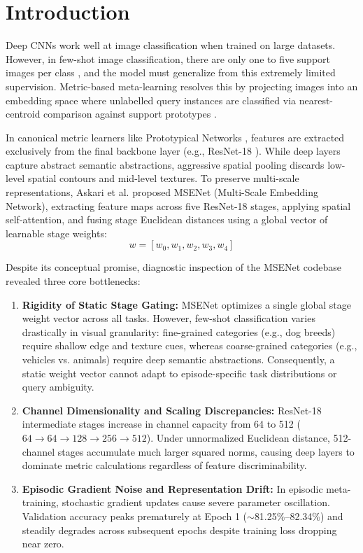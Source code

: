\documentclass[conference]{IEEEtran}
\begin{document}
\section{Introduction}
Deep CNNs work well at image classification when trained on large datasets. However, in few-shot image classification, there are only one to five support images per class \cite{snell2017prototypical, vinyals2016matching}, and the model must generalize from this extremely limited supervision. Metric-based meta-learning resolves this by projecting images into an embedding space where unlabelled query instances are classified via nearest-centroid comparison against support prototypes \cite{snell2017prototypical}.

In canonical metric learners like Prototypical Networks \cite{snell2017prototypical}, features are extracted exclusively from the final backbone layer (e.g., ResNet-18 \cite{he2016deep, torchvision_resnet}). While deep layers capture abstract semantic abstractions, aggressive spatial pooling discards low-level spatial contours and mid-level textures. To preserve multi-scale representations, Askari et al. \cite{askari2023enhancing} proposed MSENet (Multi-Scale Embedding Network), extracting feature maps across five ResNet-18 stages, applying spatial self-attention, and fusing stage Euclidean distances using a global vector of learnable stage weights:
\begin{equation}
    w = [w_0, w_1, w_2, w_3, w_4]
\end{equation}

Despite its conceptual promise, diagnostic inspection of the MSENet codebase revealed three core bottlenecks:
\begin{enumerate}
    \item \textbf{Rigidity of Static Stage Gating:} MSENet optimizes a single global stage weight vector across all tasks. However, few-shot classification varies drastically in visual granularity: fine-grained categories (e.g., dog breeds) require shallow edge and texture cues, whereas coarse-grained categories (e.g., vehicles vs. animals) require deep semantic abstractions. Consequently, a static weight vector cannot adapt to episode-specific task distributions or query ambiguity.
    \item \textbf{Channel Dimensionality and Scaling Discrepancies:} ResNet-18 intermediate stages increase in channel capacity from 64 to 512 ($64 \to 64 \to 128 \to 256 \to 512$). Under unnormalized Euclidean distance, 512-channel stages accumulate much larger squared norms, causing deep layers to dominate metric calculations regardless of feature discriminability.
    \item \textbf{Episodic Gradient Noise and Representation Drift:} In episodic meta-training, stochastic gradient updates cause severe parameter oscillation. Validation accuracy peaks prematurely at Epoch 1 ($\sim$81.25\%--82.34\%) and steadily degrades across subsequent epochs despite training loss dropping near zero.
\end{enumerate}
\end{document}
